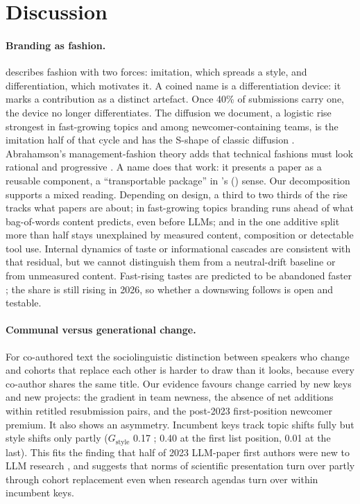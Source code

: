 \section{Discussion}
\label{sec:nt-discussion}

\paragraph{Branding as fashion.}
\citet{simmel1957fashion} describes fashion with two forces: imitation, which spreads a style, and differentiation, which motivates it. A coined name is a differentiation device: it marks a contribution as a distinct artefact. Once 40\% of submissions carry one, the device no longer differentiates. The diffusion we document, a logistic rise strongest in fast-growing topics and among newcomer-containing teams, is the imitation half of that cycle and has the S-shape of classic diffusion \citep{bass1969new}. Abrahamson's management-fashion theory adds that technical fashions must look rational and progressive \citep{abrahamson1991managerial,abrahamson1996management}. A name does that work: it presents a paper as a reusable component, a ``transportable package'' in \citeauthor{fujimura1988bandwagon}'s (\citeyear{fujimura1988bandwagon}) sense. Our decomposition supports a mixed reading. Depending on design, a third to two thirds of the rise tracks what papers are about; in fast-growing topics branding runs ahead of what bag-of-words content predicts, even before LLMs; and in the one additive split more than half stays unexplained by measured content, composition or detectable tool use. Internal dynamics of taste \citep{lieberson2000matter} or informational cascades \citep{bikhchandani1992theory} are consistent with that residual, but we cannot distinguish them from a neutral-drift baseline \citep{bentley2004random} or from unmeasured content. Fast-rising tastes are predicted to be abandoned faster \citep{berger2009adoption}; the \NAME{} share is still rising in 2026, so whether a downswing follows \citep{abrahamson1999lifecycles} is open and testable.

\paragraph{Communal versus generational change.}
For co-authored text the sociolinguistic distinction between speakers who change and cohorts that replace each other is harder to draw than it looks, because every co-author shares the same title. Our evidence favours change carried by new keys and new projects: the gradient in team newness, the absence of net \NAME{} additions within retitled resubmission pairs, and the post-2023 first-position newcomer premium. It also shows an asymmetry. Incumbent keys track topic shifts fully but style shifts only partly ($G_{\text{style}}$ 0.17 ; 0.40 at the first list position, 0.01 at the last). This fits the finding that half of 2023 LLM-paper first authors were new to LLM research \citep{movva2024topics}, and suggests that norms of scientific presentation turn over partly through cohort replacement even when research agendas turn over within incumbent keys.

